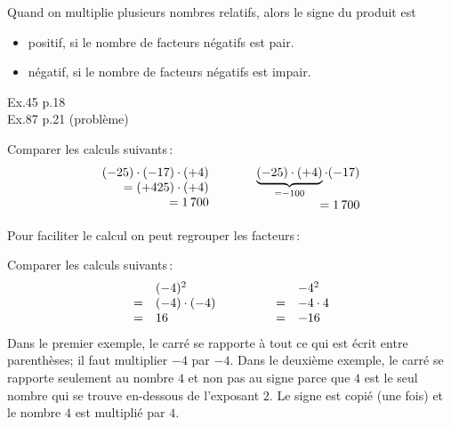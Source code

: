 
\ret
 {Quand on multiplie plusieurs nombres relatifs, alors le signe du produit est
  \begin{itemize}
    \item positif, si le nombre de facteurs négatifs est pair.
    \item négatif, si le nombre de facteurs négatifs est impair.
  \end{itemize}
 }
\arrow Ex.45 p.18 \\
\arrow Ex.87 p.21 (problème)

Comparer les calculs suivants\,:
$$\begin{array}[t]{rl}
 (-25) \cdot (-17) \cdot (+4) \\
  = (+425) \cdot (+4) \\
  = 1\,700
\end{array}
\hspace{1cm}
\begin{array}[t]{rl}
  \underbrace{(-25)\cdot(+4)}_{= -100} \cdot (-17) \\
  = 1\,700
 \end{array}$$

Pour faciliter le calcul on peut regrouper les facteurs\,:


Comparer les calculs suivants\,:
\[\begin{array}{rlp{1cm}rl}
 & (-4)^2 &&& -4^2 \\
 = &(-4) \cdot (-4) &&= &-4 \cdot 4 \\
 = &16 &&= &-16
\end{array}\]
Dans le premier exemple, le carré se rapporte à tout ce qui est écrit entre parenthèses; il faut multiplier $-4$ par $-4$.
Dans le deuxième exemple, le carré se rapporte seulement au nombre $4$ et non pas au signe parce que $4$ est le seul nombre qui se trouve en-dessous de l'exposant $2$. Le signe est copié (une fois) et le nombre $4$ est multiplié par $4$.



